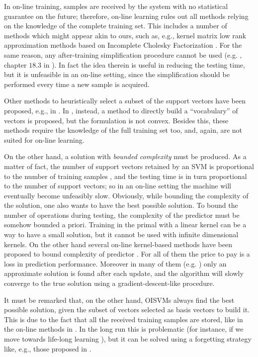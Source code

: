 In on-line training, samples are received by the system with no
statistical guarantee on the future; therefore, on-line learning rules
out all methods relying on the knowledge of the complete training
set. This includes a number of methods which might appear akin to
ours, such as, e.g., kernel matrix low rank approximation methods
based on Incomplete Cholesky Factorization
\cite{FineS02,Baudat03,BachJordan2005}. For the same reason, any
after-training simplification procedure cannot be used
(e.g. \cite{DownsGM01,NguyenH05}, chapter $18.3$ in \cite{SmolaS02}).
In fact the idea therein is useful in reducing the testing time, but
it is unfeasible in an on-line setting, since the simplification
should be performed every time a new sample is acquired.

Other methods to heuristically select a subset of the support vectors
have been proposed, e.g., in \cite{LeeM01,KeerthiCDC06}. In
\cite{WuSB06}, instead, a method to directly build a ``vocabulary'' of
vectors is proposed, but the formulation is not convex.
Besides this, these
methods require the knowledge of the full training set too, and,
again, are not suited for on-line learning.

On the other hand, a solution with \emph{bounded complexity} must be
produced. As a matter of fact, the number of support vectors retained
by an SVM is proportional to the number of training samples
\cite{Steinwart03}, and the testing time is in turn proportional to
the number of support vectors; so in an on-line setting the machine
will eventually become unfeasibly slow. Obviously, while bounding the
complexity of the solution, one also wants to have the best possible
solution.
To bound the number of operations during testing, the complexity of
the predictor must be somehow bounded a priori. Training in the primal
with a linear kernel can be a way to have a small solution, but it
cannot be used with infinite dimensional kernels. On the other hand
several on-line kernel-based methods have been proposed to bound
complexity of predictor
\cite{CsatoO01,EngelMM04,KivinenSW04,WestonBB05,ChengVSWC07}. For all
of them the price to pay is a loss in prediction performance.
Moreover in many of them
(e.g. \cite{CsatoO01,KivinenSW04,WestonBB05,ChengVSWC07}) only an
approximate solution is found after each update, and the algorithm
will slowly converge to the true solution using a
gradient-descent-like procedure.

It must be remarked that, on the other hand, OISVMs always find
the best possible solution, given the subset of vectors selected as
basis vectors to build it. This is due to the fact that all the
received training samples are stored, like in the on-line methods in
\cite{CauwenberghsP00}. In the long run this is problematic (for
instance, if we move towards life-long learning \cite{Thrun95k}), but
it can be solved using a forgetting strategy like, e.g., those
proposed in \cite{WestonBB05}.

